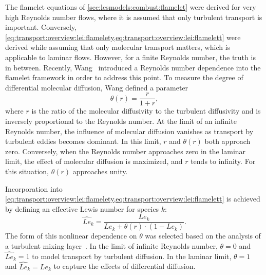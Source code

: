 The flamelet equations of \cref{sec:lesmodels:combust:flamelet} were derived for very high Reynolds number flows, where it is assumed that only turbulent transport is important. Conversely, \cref{eq:transport:overview:lei:flamelety,eq:transport:overview:lei:flamelett} were derived while assuming that only molecular transport matters, which is applicable to laminar flows. However, for a finite Reynolds number, the truth is in between. Recently, Wang~\cite{wang2016} introduced a Reynolds number dependence into the flamelet framework in order to address this point. To measure the degree of differential molecular diffusion, Wang defined a parameter
\begin{equation}\label{eq:transport:overview:bimodal:theta}
  \theta(r)= \frac{r}{1 + r},
\end{equation}
where $r$ is the ratio of the molecular diffusivity to the turbulent diffusivity and is inversely proportional to the Reynolds number. At the limit of an infinite Reynolds number, the influence of molecular diffusion vanishes as transport by turbulent eddies becomes dominant. In this limit, $r$ and $\theta(r)$ both approach zero. Conversely, when the Reynolds number approaches zero in the laminar limit, the effect of molecular diffusion is maximized, and $r$ tends to infinity. For this situation, $\theta(r)$ approaches unity.

Incorporation into \cref{eq:transport:overview:lei:flamelety,eq:transport:overview:lei:flamelett} is achieved by defining an effective Lewis number for species $k$:
\begin{equation}\label{eq:transport:overview:bimodal:lek}
  \hat{Le}_k = \frac{Le_k}{Le_k + \theta(r) \cdot (1 - Le_k)}.
\end{equation}
The form of this nonlinear dependence on $\theta$ was selected based on the analysis of a turbulent mixing layer~\cite{wang2016}. In the limit of infinite Reynolds number, $\theta = 0$ and $\hat{Le}_k = 1$ to model transport by turbulent diffusion. In the laminar limit, $\theta = 1$ and $\hat{Le}_k = Le_k$ to capture the effects of differential diffusion. %

